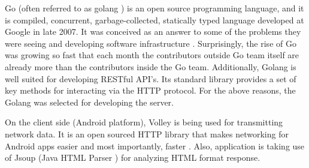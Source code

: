 Go (often referred to as golang \cite{google.golang.2016}) is an open source programming language, and it is compiled, concurrent, garbage-collected, statically typed language developed at Google in late 2007. It was conceived as an answer to some of the problems they were seeing and developing software infrastructure \cite{google.talk-golang.2012}. Surprisingly, the rise of Go was growing so fast that each month the contributors outside Go team itself are already more than the contributors inside the Go team. Additionally, Golang is well suited for developing RESTful API’s. Its  standard library provides a set of key methods for interacting via the HTTP protocol. For the above reasons, the Golang was selected for developing the server. 

On the client side (Android platform), Volley is being used for transmitting network data. It is an open sourced HTTP library that makes networking for Android apps easier and most importantly, faster \cite{google.volley.2016}. Also, application is taking use of Jsoup (Java HTML Parser \cite{joup.2016}) for analyzing HTML format response.

